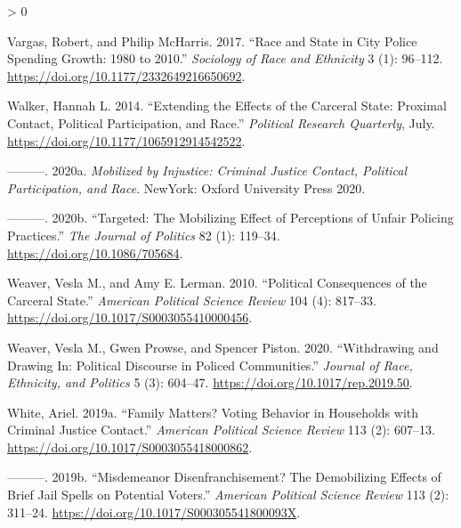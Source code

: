 \documentclass[
  12pt,
]{article}
\newlength{\cslhangindent}
\newenvironment{CSLReferences}[2] %
 {%
  \setlength{\parindent}{0pt}
  \ifodd #1 \everypar{\setlength{\hangindent}{\cslhangindent}}\ignorespaces\fi
  \ifnum #2 > 0
  \setlength{\parskip}{#2\baselineskip}
  \fi
 }%
 {}
\begin{document}
\begin{CSLReferences}{1}{0}
\leavevmode\hypertarget{ref-Vargas2017}{}%
Vargas, Robert, and Philip McHarris. 2017. {``Race and {State} in {City Police Spending Growth}: 1980 to 2010.''} \emph{Sociology of Race and Ethnicity} 3 (1): 96--112. \url{https://doi.org/10.1177/2332649216650692}.

\leavevmode\hypertarget{ref-Walker2014}{}%
Walker, Hannah L. 2014. {``Extending the {Effects} of the {Carceral State}: {Proximal Contact}, {Political Participation}, and {Race}.''} \emph{Political Research Quarterly}, July. \url{https://doi.org/10.1177/1065912914542522}.

\leavevmode\hypertarget{ref-Walker2020}{}%
---------. 2020a. \emph{Mobilized by Injustice: Criminal Justice Contact, Political Participation, and Race}. {NewYork}: {Oxford University Press 2020}.

\leavevmode\hypertarget{ref-Walker2020a}{}%
---------. 2020b. {``Targeted: {The Mobilizing Effect} of {Perceptions} of {Unfair Policing Practices}.''} \emph{The Journal of Politics} 82 (1): 119--34. \url{https://doi.org/10.1086/705684}.

\leavevmode\hypertarget{ref-Weaver2010}{}%
Weaver, Vesla M., and Amy E. Lerman. 2010. {``Political {Consequences} of the {Carceral State}.''} \emph{American Political Science Review} 104 (4): 817--33. \url{https://doi.org/10.1017/S0003055410000456}.

\leavevmode\hypertarget{ref-Weaver2020}{}%
Weaver, Vesla M., Gwen Prowse, and Spencer Piston. 2020. {``Withdrawing and {Drawing In}: {Political Discourse} in {Policed Communities}.''} \emph{Journal of Race, Ethnicity, and Politics} 5 (3): 604--47. \url{https://doi.org/10.1017/rep.2019.50}.

\leavevmode\hypertarget{ref-White2019}{}%
White, Ariel. 2019a. {``Family {Matters}? {Voting Behavior} in {Households} with {Criminal Justice Contact}.''} \emph{American Political Science Review} 113 (2): 607--13. \url{https://doi.org/10.1017/S0003055418000862}.

\leavevmode\hypertarget{ref-White2019a}{}%
---------. 2019b. {``Misdemeanor {Disenfranchisement}? {The Demobilizing Effects} of {Brief Jail Spells} on {Potential Voters}.''} \emph{American Political Science Review} 113 (2): 311--24. \url{https://doi.org/10.1017/S000305541800093X}.

\end{CSLReferences}
\end{document}
